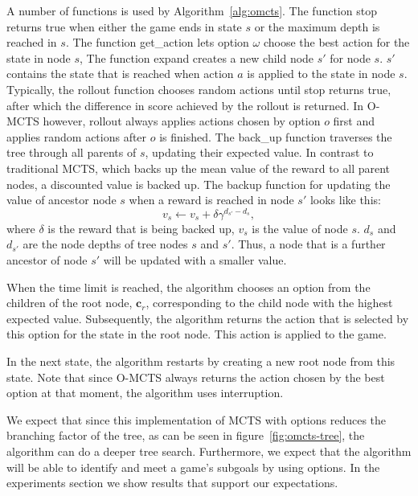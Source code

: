A number of functions is used by Algorithm~\ref{alg:omcts}. The function
\textsf{stop} returns true when either the game ends in state $s$ or the maximum
depth is reached in $s$. The function \textsf{get\_action} lets option $\omega$
choose the best action for the state in node $s$, The function \textsf{expand}
creates a new child node $s'$ for node $s$. $s'$ contains the state that is
reached when action $a$ is applied to the state in node $s$. Typically, the
\textsf{rollout} function chooses random actions until \textsf{stop} returns
true, after which the difference in score achieved by the rollout is returned.
In O-MCTS however, \textsf{rollout} always applies actions chosen by option $o$
first and applies random actions after $o$ is finished. The \textsf{back\_up}
function traverses the tree through all parents of $s$, updating their expected
value. In contrast to traditional MCTS, which backs up the mean value of the
reward to all parent nodes, a discounted value is backed up. The backup function
for updating the value of ancestor node $s$ when a reward is reached in node $s'$
looks like this:
\begin{equation}
	\label{eq:backup}
	v_s \gets v_s + \delta\gamma^{d_{s'}-d_{s}},
\end{equation}
where $\delta$ is the reward that is being backed up, $v_s$ is the value of node
$s$. $d_s$ and $d_{s'}$ are the node depths of tree nodes $s$ and $s'$. Thus, a
node that is a further ancestor of node $s'$ will be updated with a smaller
value.

When the time limit is reached, the algorithm chooses an option from the
children of the root node, $\mathbf{c}_r$, corresponding to the child node with the
highest expected value. Subsequently, the algorithm returns the action that is
selected by this option for the state in the root node. This action is applied
to the game.

In the next state, the algorithm restarts by creating a new root node from
this state. Note that since O-MCTS always returns the action chosen by the best
option at that moment, the algorithm uses interruption.

We expect that since this implementation of MCTS with options reduces the
branching factor of the tree, as can be seen in figure~\ref{fig:omcts-tree}, the
algorithm can do a deeper tree search.  Furthermore, we expect that the
algorithm will be able to identify and meet a game's subgoals by using options.
In the experiments section we show results that support our expectations.
